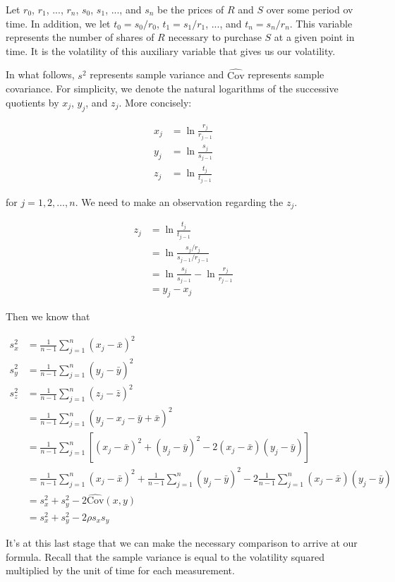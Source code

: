 \documentclass{ximera}
\begin{document}
Let $r_0$, $r_1$, ..., $r_n$, $s_0$, $s_1$, ..., and $s_n$ be the prices of $R$ and $S$ over some period ov time. In addition, we let $t_0=s_0/r_0$, $t_1=s_1/r_1$, ..., and $t_n=s_n/r_n$. This variable represents the number of shares of $R$ necessary to purchase $S$ at a given point in time. It is the volatility of this auxiliary variable that gives us our volatility.

In what follows, $s^2$ represents sample variance and $\hat{\text{Cov}}$ represents sample covariance. For simplicity, we denote the natural logarithms of the successive quotients by $x_j$, $y_j$, and $z_j$. More concisely:

\begin{align*}
x_j 	&=\ln\frac{r_j}{r_{j-1}}\\
y_j 	&=\ln\frac{s_j}{s_{j-1}}\\
z_j 	&=\ln\frac{t_j}{t_{j-1}}
\end{align*} 

for $j=1,2,\dots, n$. We need to make an observation regarding the $z_j$.

\begin{align*}
z_j 	&=\ln\frac{t_j}{t_{j-1}}\\
	&=\ln\frac{s_j/r_j}{s_{j-1}/r_{j-1}}\\
	&=\ln\frac{s_j}{s_{j-1}}-\ln\frac{r_j}{r_{j-1}}\\
	&=y_j-x_j
\end{align*}

Then we know that

\begin{align*}
s_x^2 	&=\frac{1}{n-1}\sum_{j=1}^n(x_j-\bar{x})^2\\
s_y^2 	&=\frac{1}{n-1}\sum_{j=1}^n(y_j-\bar{y})^2\\
s_z^2 	&=\frac{1}{n-1}\sum_{j=1}^n(z_j-\bar{z})^2\\
		&=\frac{1}{n-1}\sum_{j=1}^n(y_j-x_j-\bar{y}+\bar{x})^2\\
		&=\frac{1}{n-1}\sum_{j=1}^n[(x_j-\bar{x})^2+(y_j-\bar{y})^2-2(x_j-\bar{x})(y_j-\bar{y})]\\
		&=\frac{1}{n-1}\sum_{j=1}^n(x_j-\bar{x})^2+\frac{1}{n-1}\sum_{j=1}^n(y_j-\bar{y})^2-2\frac{1}{n-1}\sum_{j=1}^n(x_j-\bar{x})(y_j-\bar{y})\\
		&=s_x^2+s_y^2-2\widehat{\text{Cov}}(x,y)\\
		&=s_x^2+s_y^2-2\rho s_xs_y
\end{align*}

It's at this last stage that we can make the necessary comparison to arrive at our formula. Recall that the sample variance is equal to the volatility squared multiplied by the unit of time for each measurement.
\end{document}
